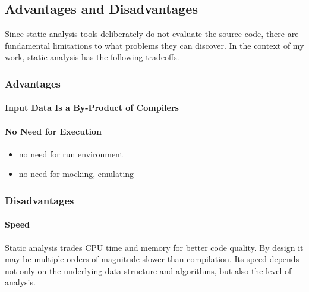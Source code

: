 \subsection{Advantages and Disadvantages}

Since static analysis tools deliberately do not evaluate the source code, there are fundamental limitations to what problems they can discover. In the context of my work, static analysis has the following tradeoffs.

\subsubsection{Advantages}
\paragraph{Input Data Is a By-Product of Compilers}

\paragraph{No Need for Execution}
\begin{itemize}
  \item no need for run environment
  \item no need for mocking, emulating
\end{itemize}

\subsubsection{Disadvantages}
\paragraph{Speed} Static analysis trades CPU time and memory for better code quality. By design it may be multiple orders of magnitude slower than compilation. Its speed depends not only on the underlying data structure and algorithms, but also the level of analysis.
%
%

